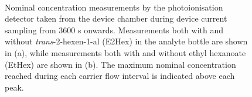 \documentclass[
  a4paper,
]{scrbook}
\begin{document}
\begin{figure}
\begin{minipage}[t]{0.01\linewidth}
\end{minipage}%
%
\begin{minipage}[t]{0.70\linewidth}

{\centering 


}

\end{minipage}%
%
\begin{minipage}[t]{0.15\linewidth}

{\centering 

~

}

\end{minipage}%

\caption[Nominal concentration measurements by the photoionisation
detector taken from the device chamber during device current sampling
from 3600 s onwards, with and without \emph{trans}-2-hexen-1-al (E2Hex)
or ethyl hexanoate (EtHex) present in the analyte
bottle.]{\label{fig-EtHex-sampling-PID}Nominal concentration
measurements by the photoionisation detector taken from the device
chamber during device current sampling from 3600 s onwards. Measurements
both with and without \emph{trans}-2-hexen-1-al (E2Hex) in the analyte
bottle are shown in (a), while measurements both with and without ethyl
hexanoate (EtHex) are shown in (b). The maximum nominal concentration
reached during each carrier flow interval is indicated above each peak.}

\end{figure}
\end{document}
